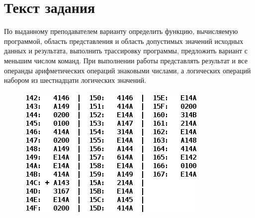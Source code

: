 \section{Текст задания}
По выданному преподавателем варианту определить функцию, вычисляемую программой,
область представления и область допустимых значений исходных данных и результата,
выполнить трассировку программы, предложить вариант с меньшим числом команд.
При выполнении работы представлять результат и все операнды арифметических операций знаковыми числами,
а логических операций набором из шестнадцати логических значений.
\begin{figure}[ht]
    \centering
    \includegraphics{img/task.png}
\end{figure}